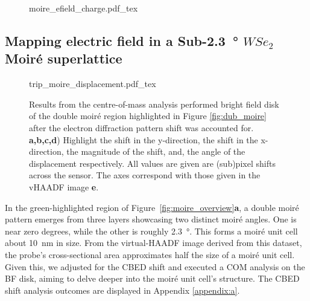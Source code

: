 \begin{figure}
    \centering
    \def\svgwidth{.5\linewidth}
    {moire_efield_charge.pdf_tex}
    \caption{}
    \label{fig:m_mom}
\end{figure}

\subsection{Mapping electric field in a Sub-\SI{2.3}{\degree} $WSe_2$ Moiré superlattice}
\label{sec:large_moire}
\begin{figure}
    \centering
    \def\svgwidth{.95\linewidth}
    {trip_moire_displacement.pdf_tex}
    \caption{Results from the centre-of-mass analysis performed bright field disk of the double moiré region highlighted in Figure \ref{fig:dub_moire} after the electron diffraction pattern shift was accounted for. \textbf{a,b,c,d}) Highlight the shift in the y-direction, the shift in the x-direction, the magnitude of the shift, and, the angle of the displacement respectively. All values are given are (sub)pixel shifts across the sensor. The axes correspond with those given in the vHAADF image \textbf{e}.}
    \label{fig:trip_m_dis}
\end{figure}

In the green-highlighted region of Figure~\ref{fig:moire_overview}\textbf{a}, a double moiré pattern emerges from three layers showcasing two distinct moiré angles.
%
One is near zero degrees, while the other is roughly \SI{2.3}{\degree}.
%
This forms a moiré unit cell about \SI{10}{\nano\meter} in size. 
%
From the virtual-HAADF image derived from this dataset, the probe's cross-sectional area approximates half the size of a moiré unit cell. 
%
Given this, we adjusted for the CBED shift and executed a COM analysis on the BF disk, aiming to delve deeper into the moiré unit cell's structure. 
%
The CBED shift analysis outcomes are displayed in Appendix \ref{appendix:a}.

